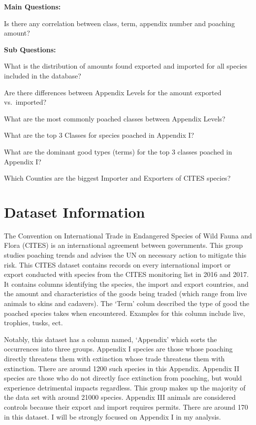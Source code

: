 \documentclass[
  12pt,
]{article}
\begin{document}
\textbf{Main Questions:}

Is there any correlation between class, term, appendix number and
poaching amount?

\textbf{Sub Questions:}

What is the distribution of amounts found exported and imported for all
species included in the database?

Are there differences between Appendix Levels for the amount exported
vs.~imported?

What are the most commonly poached classes between Appendix Levels?

What are the top 3 Classes for species poached in Appendix I?

What are the dominant good types (terms) for the top 3 classes poached
in Appendix I?

Which Counties are the biggest Importer and Exporters of CITES species?

\newpage

\hypertarget{dataset-information}{%
\section{Dataset Information}\label{dataset-information}}

The Convention on International Trade in Endangered Species of Wild
Fauna and Flora (CITES) is an international agreement between
governments. This group studies poaching trends and advises the UN on
necessary action to mitigate this risk. This CITES dataset contains
records on every international import or export conducted with species
from the CITES monitoring list in 2016 and 2017. It contains columns
identifying the species, the import and export countries, and the amount
and characteristics of the goods being traded (which range from live
animals to skins and cadavers). The `Term' colum described the type of
good the poached species takes when encountered. Examples for this
column include live, trophies, tusks, ect.

Notably, this dataset has a column named, `Appendix' which sorts the
occurrences into three groups. Appendix I species are those whose
poaching directly threatens them with extinction whose trade threatens
them with extinction. There are around 1200 such species in this
Appendix. Appendix II species are those who do not directly face
extinction from poaching, but would experience detrimental impacts
regardless. This group makes up the majority of the data set with around
21000 species. Appendix III animals are considered controls because
their export and import requires permits. There are around 170 in this
dataset. I will be strongly focused on Appendix I in my analysis.
\end{document}
